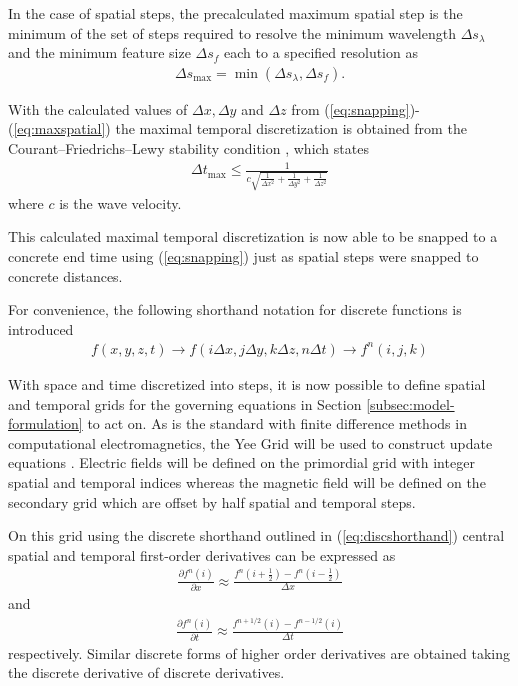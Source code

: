 In the case of spatial steps, the precalculated maximum spatial step is the minimum of the set of steps required to resolve the minimum wavelength $\Delta s_\lambda$ and the minimum feature size $\Delta s_f$ each to a specified resolution as
\begin{align}
	\Delta s_{\max} = \min{(\Delta s_\lambda, \Delta s_f)}.
	\label{eq:maxspatial}
\end{align}

With the calculated values of $\Delta x, \Delta y$ and $\Delta z$ from  (\ref{eq:snapping})-(\ref{eq:maxspatial}) the maximal temporal discretization is obtained from the Courant–Friedrichs–Lewy stability condition \cite{jin2011theory}, which states
\begin{align}
	\Delta t_{\max} \leq \frac{1}{c\sqrt{\frac{1}{\Delta x^2}+\frac{1}{\Delta y^2}+\frac{1}{\Delta z^2}}}
\end{align}
where $c$ is the wave velocity.

This calculated maximal temporal discretization is now able to be snapped to a concrete end time using  (\ref{eq:snapping}) just as spatial steps were snapped to concrete distances.

For convenience, the following shorthand notation for discrete functions is introduced
\begin{align}
	f(x,y,z,t)\rightarrow f(i\Delta x, j\Delta y, k\Delta z, n\Delta t)\rightarrow f^n(i,j,k)
	\label{eq:discshorthand}
\end{align}

With space and time discretized into steps, it is now possible to define spatial and temporal grids for the governing equations in Section \ref{subsec:model-formulation} to act on. As is the standard with finite difference methods in computational electromagnetics, the Yee Grid will be used to construct update equations \cite{taftlovefdtd}. Electric fields will be defined on the primordial grid with integer spatial and temporal indices whereas the magnetic field will be defined on the secondary grid which are offset by half spatial and temporal steps.

On this grid using the discrete shorthand outlined in  (\ref{eq:discshorthand}) central spatial and temporal first-order derivatives can be expressed as
\begin{align}
	\frac{\partial f^n(i)}{\partial x} \approx \frac{f^n(i+\frac{1}{2})- f^n(i-\frac{1}{2})}{\Delta x}
	\label{eq:derivspace}
\end{align}
and
\begin{align}
	\frac{\partial f^n(i)}{\partial t} \approx \frac{f^{n+1/2}(i)- f^{n-1/2}(i)}{\Delta t}
	\label{eq:derivtime}
\end{align}
respectively. Similar discrete forms of higher order derivatives are obtained taking the discrete derivative of discrete derivatives.

